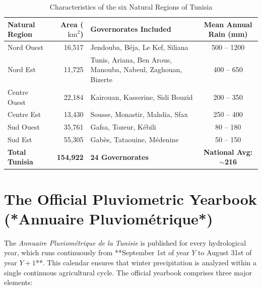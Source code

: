 \documentclass[12pt,a4paper]{report}
\begin{document}
\begin{table}[htbp]
\centering
\caption{Characteristics of the six Natural Regions of Tunisia \cite{dgre2023}}
\label{tab:regions}
\small
\begin{tabular}{lrlc}
\toprule
\textbf{Natural Region} & \textbf{Area ($\text{km}^2$)} & \textbf{Governorates Included} & \textbf{Mean Annual Rain (mm)} \\
\midrule
Nord Ouest & 16,517 & Jendouba, Béja, Le Kef, Siliana & 500 -- 1200 \\
Nord Est & 11,725 & Tunis, Ariana, Ben Arous, Manouba, Nabeul, Zaghouan, Bizerte & 400 -- 650 \\
Centre Ouest & 22,184 & Kairouan, Kasserine, Sidi Bouzid & 200 -- 350 \\
Centre Est & 13,430 & Sousse, Monastir, Mahdia, Sfax & 250 -- 400 \\
Sud Ouest & 35,761 & Gafsa, Tozeur, Kébili & 80 -- 180 \\
Sud Est & 55,305 & Gabès, Tataouine, Médenine & 50 -- 150 \\
\midrule
\textbf{Total Tunisia} & \textbf{154,922} & \textbf{24 Governorates} & \textbf{National Avg: $\sim$216} \\
\bottomrule
\end{tabular}
\end{table}

\section{The Official Pluviometric Yearbook (*Annuaire Pluviométrique*)}

The \textit{Annuaire Pluviométrique de la Tunisie} is published for every hydrological year, which runs continuously from **September 1st of year $Y$ to August 31st of year $Y+1$**. This calendar ensures that winter precipitation is analyzed within a single continuous agricultural cycle. The official yearbook comprises three major elements:
\end{document}

